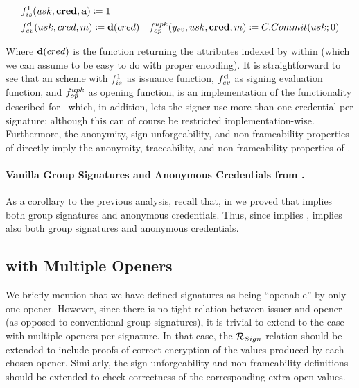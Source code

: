 \begin{align}
  & f_{is}^1(usk,\mathbf{cred},\mathbf{a}) \coloneqq 1 \nonumber \\
  & f_{ev}^{\mathbf{d}}(usk,cred,m) \coloneqq \mathbf{d}(cred)
  & f_{op}^{upk}(y_{ev},usk,\mathbf{cred},m) \coloneqq C.Commit(usk;0) \nonumber \\
    \label{eq:uas-gsac-funcs}
\end{align}

Where $\mathbf{d}(cred)$ is the function returning the attributes indexed by
\dattrs within \cred (which we can assume to be easy to do with proper
encoding). It is straightforward to see that an \UAS scheme with $f_{is}^1$
as issuance function, $f_{ev}^{\mathbf{d}}$ as signing evaluation function, and
$f_{op}^{upk}$ as opening function, is an implementation of the functionality
described for \GSAC --which, in addition, lets the signer use more than one
credential per signature; although this can of course be restricted
implementation-wise.
%
Furthermore, the anonymity, sign unforgeability, and non-frameability properties
of \UAS directly imply the anonymity, traceability, and non-frameability
properties of \GSAC.

\paragraph{Vanilla Group Signatures and Anonymous Credentials from \UAS.} As a
corollary to the previous analysis, recall that, in 
we proved that \GSAC implies both group signatures and anonymous credentials.
Thus, since \UAS implies \GSAC, \UAS implies also both group signatures and
anonymous credentials.

\subsection{\UAS with Multiple Openers}
\label{ssec:uas-multiopen}

We briefly mention that we have defined \UAS signatures as being ``openable'' by
only one opener. However, since there is no tight relation between issuer and
opener (as opposed to conventional group signatures), it is trivial to
extend to the case with multiple openers per signature. In that case, the
$\mathcal{R}_{Sign}$ relation should be extended to include proofs of correct
encryption of the \yinsp values produced by each chosen opener.
Similarly, the sign unforgeability and non-frameability definitions should be
extended to check correctness of the corresponding extra open values.

